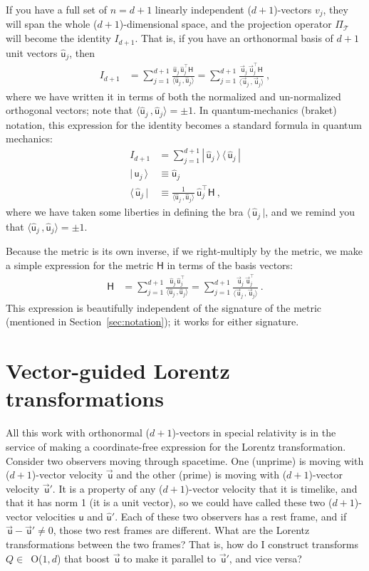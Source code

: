 \documentclass{article}
\newcommand{\metric}{\mathsf{H}}
\newcommand\upvec[1]{\!\vec{\,\mathrm{#1}}}
\newcommand{\Lvec}[1]{\upvec{\mathsf{#1}}} %
\newcommand{\Lhat}[1]{\hat{\mathsf{#1}}} %
\newcommand{\inner}[2]{\langle{#1}\,,{#2}\rangle}
\newcommand{\bra}[1]{\langle\,{#1}\,|}
\newcommand{\ket}[1]{|\,{#1}\,\rangle}
\newcommand{\ketbra}[2]{|\,{#1}\,\rangle\,\langle\,{#2}\,|}
\newcommand{\plus}{\!+\!} %
\newcommand{\secref}[1]{Section~\ref{#1}}
\begin{document}
If you have a full set of $n=d+1$ linearly independent ($d\plus1$)-vectors $v_j$, they will span the whole ($d\plus1$)-dimensional space, and the projection operator $\Pi_\mathscr{T}$ will become the identity $I_{d+1}$.
That is, if you have an orthonormal basis of $d+1$ unit vectors $\Lhat{u}_j$, then
\begin{align}
    I_{d+1} &= \sum_{j=1}^{d+1} \frac{\Lhat{u}_j\,\Lhat{u}_j^\top\metric}{\inner{\Lhat{u}_j}{\Lhat{u}_j}} = \sum_{j=1}^{d+1} \frac{\Lvec{u}_j\,\Lvec{u}_j^\top\metric}{\inner{\Lvec{u}_j}{\Lvec{u}_j}} ~,
\end{align}
where we have written it in terms of both the normalized and un-normalized orthogonal vectors; note that $\inner{\Lhat{u}_j}{\Lhat{u}_j}=\pm 1$.
In quantum-mechanics (braket) notation, this expression for the identity becomes a standard formula in quantum mechanics:
\begin{align}
    I_{d+1} &= \sum_{j=1}^{d+1} \ketbra{\Lhat{u}_j}{\Lhat{u}_j}
    \\
    \ket{\Lhat{u}_j} &\equiv \Lhat{u}_j\label{eq:Lket}
    \\
    \bra{\Lhat{u}_j} &\equiv \frac{1}{\inner{\Lhat{u}_j}{\Lhat{u}_j}}\,\Lhat{u}_j^\top\metric ~,\label{eq:Lbra}
\end{align}
where we have taken some liberties in defining the bra $\bra{\Lhat{u}_j}$, and we remind you that $\inner{\Lhat{u}_j}{\Lhat{u}_j}=\pm 1$.

Because the metric is its own inverse, if we right-multiply by the metric, we make a simple expression for the metric $\metric$ in terms of the basis vectors:
\begin{align}
    \metric &= \sum_{j=1}^{d+1} \frac{\Lhat{u}_j\,\Lhat{u}_j^\top}{\inner{\Lhat{u}_j}{\Lhat{u}_j}} = \sum_{j=1}^{d+1} \frac{\Lvec{u}_j\,\Lvec{u}_j^\top}{\inner{\Lvec{u}_j}{\Lvec{u}_j}} ~.
\end{align}
This expression is beautifully independent of the signature of the metric (mentioned in \secref{sec:notation}); it works for either signature.

\section{Vector-guided Lorentz transformations}\label{sec:lt}

All this work with orthonormal ($d\plus1$)-vectors in special relativity is in the service of making a coordinate-free expression for the Lorentz transformation.
Consider two observers moving through spacetime.
One (unprime) is moving with ($d\plus1$)-vector velocity $\Lvec{u}$ and the other (prime) is moving with ($d\plus1$)-vector velocity $\Lvec{u}'$.
It is a property of any ($d\plus1$)-vector velocity that it is timelike, and that it has norm 1 (it is a unit vector), so we could have called these two ($d\plus1$)-vector velocities $\Lhat{u}$ and $\Lhat{u}'$.
Each of these two observers has a rest frame, and if $\Lvec{u}-\Lvec{u}'\neq 0$, those two rest frames are different.
What are the Lorentz transformations between the two frames?
That is, how do I construct transforms $Q\in$~O($1,d$) that boost $\Lvec{u}$ to make it parallel to $\Lvec{u}'$, and vice versa?
\end{document}
